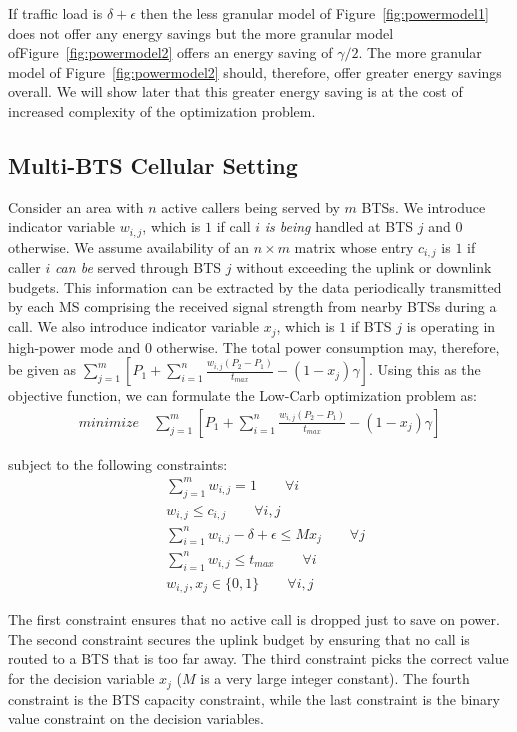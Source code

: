 If traffic load is $\delta + \epsilon$ then the less granular model of Figure~\ref{fig:powermodel1} does not offer any energy savings but the more granular model ofFigure~\ref{fig:powermodel2} offers an energy saving of $\gamma/2$. The more granular model of Figure~\ref{fig:powermodel2} should, therefore, offer greater energy savings overall. We will show later that this greater energy saving is at the cost of increased complexity of the optimization problem.  

\subsection{Multi-BTS Cellular Setting}
\label{subsec:case2:instantiate:multi-cell}
Consider an area with $n$ active callers being served by $m$ BTSs. We introduce indicator variable $w_{i,j}$, which is $1$ if call $i$ \textit{is being} handled at BTS $j$ and $0$ otherwise. We assume availability of an $n\times m$ matrix whose entry $c_{i,j}$ is $1$ if caller $i$ \textit{can be} served through
BTS $j$ without exceeding the uplink or downlink budgets. This information can be extracted by the data periodically transmitted by each MS comprising the received signal strength from nearby BTSs during a call. We also introduce indicator variable $x_j$, which is $1$ if BTS $j$ is operating in high-power mode and $0$ otherwise. The total power consumption may, therefore, be given as $\sum_{j=1}^{m} \left[P_1+\sum_{i=1}^{n}\frac{w_{i,j}(P_2-P_1)}{t_{max}}-(1-x_j)\gamma\right]$. Using this as the objective function, we can formulate the Low-Carb optimization problem as:
\begin{align}
\textit{minimize} \quad \sum_{j=1}^{m} \left[
P_1+\sum_{i=1}^{n}\frac{w_{i,j}(P_2-P_1)}{t_{max}}-(1-x_j)\gamma
\right]
\end{align}

subject to the following constraints:
\begin{align}
& \sum_{j=1}^m w_{i,j} = 1 \qquad \forall i \\
& w_{i,j} \leq c_{i,j} \qquad \forall i, j \\
& \sum_{i=1}^nw_{i,j}-\delta + \epsilon \leq Mx_j \qquad \forall j \\
& \sum_{i=1}^n w_{i,j} \le t_{max} \qquad \forall i \\
& w_{i,j}, x_j \in \{0,1\} \qquad \forall i, j%
\end{align}

The first constraint ensures that no active call is
dropped just to save on power. The second constraint secures
the uplink budget by ensuring that no call is routed to a BTS
that is too far away. The third constraint picks the correct
value for the decision variable $x_j$ ($M$ is a very large integer constant). The fourth constraint is the BTS capacity constraint, while the last
constraint is the binary value constraint on the decision
variables.

